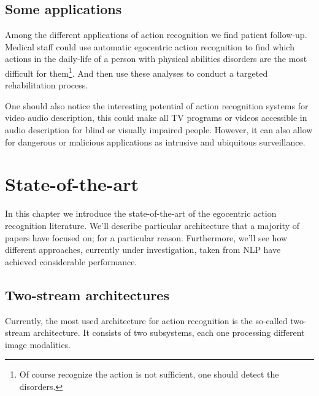 \documentclass[12pt, a4paper]{report}
\begin{document}
				\subsection*{Some applications}
					Among the different applications of action recognition we find patient follow-up.
					Medical staff could use automatic egocentric action recognition to find which actions in the daily-life of a person with physical abilities disorders are the most difficult for them\footnote{Of course recognize the action is not sufficient, one should detect the disorders.}.
					And then use these analyses to conduct a targeted rehabilitation process.
					\par
					One should also notice the interesting potential of action recognition systems for video audio description, this could make all TV programs or videos accessible in audio description for blind or visually impaired people.
					However, it can also allow for dangerous or malicious applications as intrusive and ubiquitous surveillance.
		\section{State-of-the-art}
			In this chapter we introduce the state-of-the-art of the egocentric action recognition literature.
			We'll describe particular architecture that a majority of papers have focused on; for a particular reason.
			Furthermore, we'll see how different approaches, currently under investigation, taken from NLP have achieved considerable performance.
			\subsection{Two-stream architectures}\label{twostream}
				Currently, the most used architecture for action recognition is the so-called two-stream architecture.
				It consists of two subsystems, each one processing different image modalities.
\end{document}
